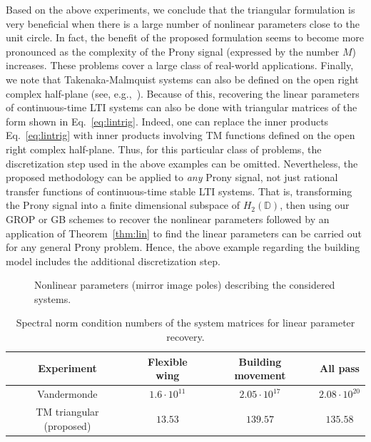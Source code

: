 \documentclass{arxiv}
\begin{document}
Based on the above experiments, we conclude that the triangular formulation is very beneficial  when there is a large number of nonlinear parameters close to the unit circle. In fact, the benefit of the proposed formulation seems to become more pronounced as the complexity of the Prony signal (expressed by the number $M$) increases. These problems cover a large class of real-world applications. Finally, we note that Takenaka-Malmquist systems can also be defined on the open right complex half-plane (see, e.g.,~\cite{eisner2014discrete}). Because of this, recovering the linear parameters of continuous-time LTI systems can also be done with triangular matrices of the form shown in Eq.~\eqref{eq:lintrig}. Indeed, one can replace the inner products Eq.~\eqref{eq:lintrig} with inner products involving TM functions defined on the open right complex half-plane. Thus, for this particular class of problems, the discretization step used in the above examples can be omitted. Nevertheless, the proposed methodology can be applied to \textit{any} Prony signal, not just rational transfer functions of continuous-time stable LTI systems. That is, transforming the Prony signal into a finite dimensional subspace of $H_2(\mathbb{D})$, then using our GROP or GB  schemes to recover the nonlinear parameters followed by an application of Theorem~\ref{thm:lin} to find the linear parameters can be carried out for any general Prony problem.  Hence, the above example regarding the building model includes the additional discretization step.
\begin{figure}[tb]
    \centering
     
     
    
    \caption{Nonlinear parameters (mirror image poles) describing the considered systems.}
    \label{fig:VanderPoles}
\end{figure}

\begin{table}[bt]
    \centering
    \caption{Spectral norm condition numbers of the system matrices for linear parameter recovery.}
    \label{tab:conds}
    \begin{tabular}{cccc}
    \toprule
        {Experiment} & Flexible wing & Building movement & All pass \\ \midrule
        {Vandermonde} & $1.6 \cdot 10^{11}$ & $2.05 \cdot 10^{17}$ & $2.08 \cdot 10^{20}$ \\ 
        {TM triangular (proposed)} & $13.53$ & $139.57$ & $135.58$ \\ \bottomrule
    \end{tabular}
\end{table}
\end{document}
